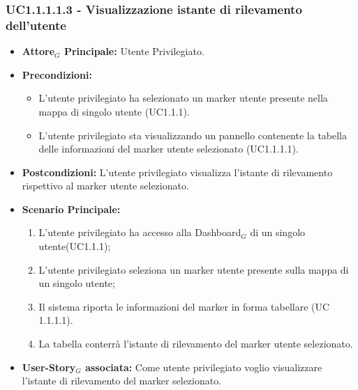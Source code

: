 \documentclass[11pt]{article}
\begin{document}
\begin{justify}
\subsubsection{\textbf{UC1.1.1.1.3 - Visualizzazione istante di rilevamento dell'utente}}
\label{UC1.1.1.1.3}
\begin{itemize}
     \item \textbf{Attore$_G$ Principale:} Utente Privilegiato.
     \item \textbf{Precondizioni:}
        \begin{itemize}
          \item L'utente privilegiato ha selezionato un marker utente presente nella mappa di singolo utente (UC1.1.1).
          \item L'utente privilegiato sta visualizzando un pannello contenente la tabella delle informazioni del marker utente selezionato (UC1.1.1.1).
        \end{itemize}
      \item \textbf{Postcondizioni:} L'utente privilegiato visualizza l'istante di rilevamento rispettivo al marker utente selezionato. 
      \item \textbf{Scenario Principale:}
        \begin{enumerate}
            \item L'utente privilegiato ha accesso alla Dashboard$_G$ di un singolo utente(UC1.1.1);
            \item L'utente privilegiato seleziona un marker utente presente sulla mappa di un singolo utente;
            \item Il sistema riporta le informazioni del marker in forma tabellare (UC 1.1.1.1).
            \item La tabella conterrà l'istante di rilevamento del marker utente selezionato.
        \end{enumerate}
     \item \textbf{User-Story$_G$ associata:}
       Come utente privilegiato voglio visualizzare l'istante di rilevamento del marker selezionato.
\end{itemize}


\end{justify}
\end{document}
